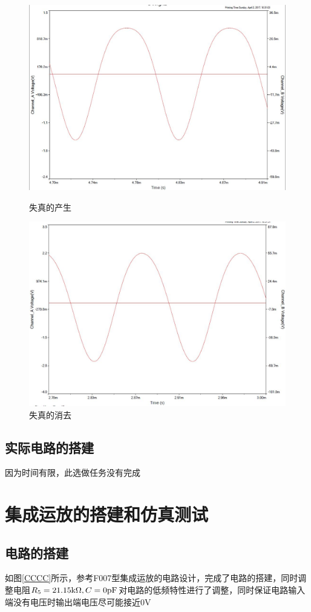 \documentclass[UTF8,a4paper]{ctexart}
\begin{document}
\begin{figure}
\centering
\includegraphics[width=\textwidth]{2-5W.jpg}
\caption{失真的产生}
\label{WG}
\includegraphics[width=\textwidth]{2-5F.jpg}
\caption{失真的消去}
\label{FG}
\end{figure}
\subsection{实际电路的搭建}
因为时间有限，此选做任务没有完成
\clearpage
\section{集成运放的搭建和仿真测试}
\subsection{电路的搭建}
如图\ref{CCCC}所示，参考F007型集成运放的电路设计，完成了电路的搭建，同时调整电阻$R_5=21.15\mathrm{k}\Omega,C=0\rm{pF}$对电路的低频特性进行了调整，同时保证电路输入端没有电压时输出端电压尽可能接近0V
\end{document}

